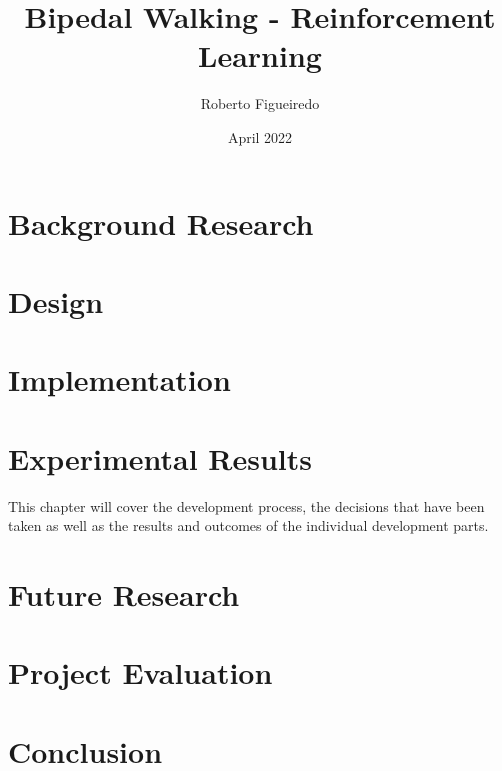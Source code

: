 \documentclass[12pt, a4paper]{report}
\title{Bipedal Walking - Reinforcement Learning}
\author{Roberto Figueiredo}
\date{April 2022}
\begin{document}
\begin{titlepage}
    \maketitle 
    \thispagestyle{empty}
\end{titlepage}





\pagebreak
\tableofcontents
\pagebreak





\chapter{Background Research}
    

\chapter{Design}




    
\chapter{Implementation}
    
\chapter{Experimental Results} %
This chapter will cover the development process, the decisions that have been taken as well as the results and outcomes of the individual development parts. %
    

\chapter{Future Research}
    

\chapter{Project Evaluation}
    

\chapter{Conclusion}
    








\end{document}
